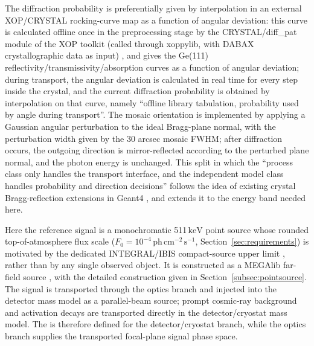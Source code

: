 \documentclass[11pt]{article}
\newcommand{\keV}{\ensuremath{\,\mathrm{keV}}}
\newcommand{\phcms}{\ensuremath{\,\mathrm{ph\,cm^{-2}\,s^{-1}}}}
\newcommand{\fzero}{F_{0}}
\begin{document}
The diffraction probability is preferentially given by interpolation in an external XOP/CRYSTAL rocking-curve map as a function of angular deviation: this curve is calculated offline once in the preprocessing stage by the CRYSTAL/diff\_pat module of the XOP toolkit (called through xoppylib, with DABAX crystallographic data as input) \cite{SanchezDelRio2011XOP}, and gives the Ge(111) reflectivity/transmissivity/absorption curves as a function of angular deviation; during transport, the angular deviation is calculated in real time for every step inside the crystal, and the current diffraction probability is obtained by interpolation on that curve, namely ``offline library tabulation, probability used by angle during transport''. The mosaic orientation is implemented by applying a Gaussian angular perturbation to the ideal Bragg-plane normal, with the perturbation width given by the 30 arcsec mosaic FWHM; after diffraction occurs, the outgoing direction is mirror-reflected according to the perturbed plane normal, and the photon energy is unchanged. This split in which the ``process class only handles the transport interface, and the independent model class handles probability and direction decisions'' follows the idea of existing crystal Bragg-reflection extensions in Geant4 \cite{Guan2023BraggReflection,Reiazi2025G4BraggReflection}, and extends it to the energy band needed here.

Here the reference signal is a monochromatic 511\keV{} point source whose
rounded top-of-atmosphere flux scale
($\fzero=10^{-4}\phcms$, Section~\ref{sec:requirements}) is motivated by the
dedicated INTEGRAL/IBIS compact-source upper limit \cite{DeCesare2011}, rather
than by any single observed object. It is constructed as a MEGAlib far-field source
\cite{Zoglauer2006}, with the detailed construction given in
Section~\ref{subsec:pointsource}. The signal is transported through the optics
branch and injected into the detector mass model as a parallel-beam source;
prompt cosmic-ray background and activation decays are transported directly in
the detector/cryostat mass model. The  is therefore
defined for the detector/cryostat branch, while the optics branch supplies the
transported focal-plane signal phase space.
\end{document}
